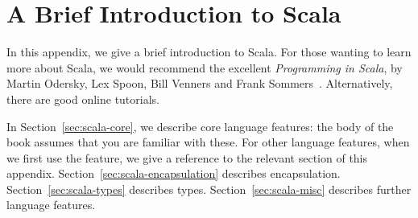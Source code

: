 

\chapter{A Brief Introduction to Scala}
\label{app:scala}

In this appendix, we give a brief introduction to Scala.
%
For those wanting to learn more about Scala, we would recommend the excellent
\emph{Programming in Scala}, by Martin Odersky, Lex Spoon, Bill Venners and
Frank Sommers~\cite{odersky+}.  Alternatively, there are good online tutorials.

In Section~\ref{sec:scala-core}, we describe core language features: the body
of the book assumes that you are familiar with these.  For other language
features, when we first use the feature, we give a reference to the relevant
section of this appendix.  Section~\ref{sec:scala-encapsulation} describes
encapsulation.  Section~\ref{sec:scala-types} describes types.
Section~\ref{sec:scala-misc} describes further language features.









